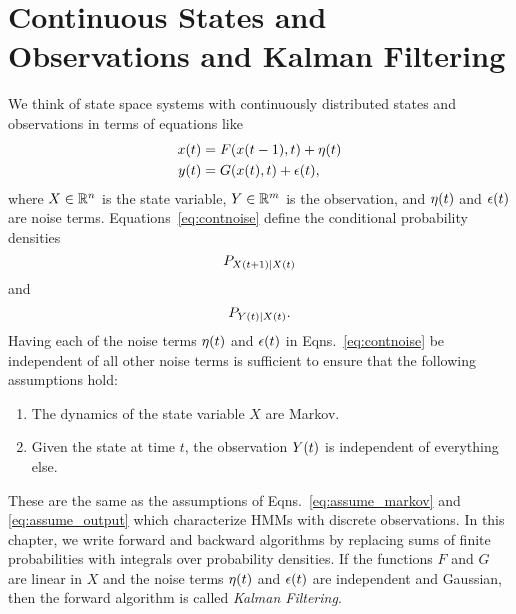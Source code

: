 \chapter{Continuous States and Observations and Kalman Filtering}
\label{chap:continuous}

We think of state space systems with continuously distributed
states and observations in terms of equations like
\begin{subequations}
  \label{eq:contnoise}
  \begin{align}
    {x}{(t)} &= F({x}{(t-1)},t) + {\eta}{(t)}\\
    {y}{(t)}   &= G({x}{(t)},t) + {\epsilon}{(t)},
  \end{align}
\end{subequations}
where $X\in\mathbb{R}^n$ is the state variable, $Y\in\mathbb{R}^m$ is the
observation, and ${\eta}{(t)}$ and ${\epsilon}{(t)}$ are noise
terms.  Equations~\eqref{eq:contnoise} define the conditional
probability densities
\begin{equation}
  \label{eq:Cstatetran}
  P_{{X}{(t+1)}|{X}{(t)}}
\end{equation}
and
\begin{equation}
  \label{eq:Cobs}
  P_{{Y}{(t)}|{X}{(t)}}.
\end{equation}
Having each of the noise terms ${\eta}{(t)}$ and ${\epsilon}{(t)}$
in Eqns.~\ref{eq:contnoise} be independent of all other noise terms is
sufficient to ensure that the following assumptions hold:
\begin{enumerate}
\item The dynamics of the state variable $X$ are Markov.
\item Given the state at time $t$, the observation ${Y}{(t)}$ is
  independent of everything else.
\end{enumerate}
These are the same as the assumptions of
Eqns.~\eqref{eq:assume_markov} and \eqref{eq:assume_output} which
characterize HMMs with discrete observations.  In this chapter, we
write forward and backward algorithms by replacing sums of finite
probabilities with integrals over probability densities.  If the
functions $F$ and $G$ are linear in $X$ and the noise terms
${\eta}{(t)}$ and ${\epsilon}{(t)}$ are independent and Gaussian,
then the forward algorithm is called \emph{Kalman Filtering}.

